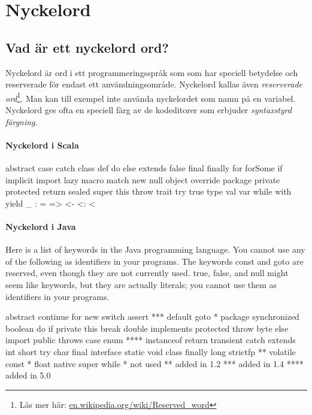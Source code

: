 
\chapter{Nyckelord}\label{appendix:keywords}

\section{Vad är ett nyckelord ord?}

Nyckelord är ord i ett programmeringsspråk som som har speciell betydelse och reserverade för endast ett användningsområde. Nyckelord kallas även \emph{reserverade ord}\footnote{Läs mer här: \href{https://en.wikipedia.org/wiki/Reserved\_word}{en.wikipedia.org/wiki/Reserved\_word}}. 
Man kan till exempel inte använda nyckelordet  som namn på en variabel. Nyckelord ges ofta en speciell färg av de kodeditorer som erbjuder \emph{syntaxstyrd färgning}. 

\subsubsection{Nyckelord i Scala} 

\begin{Code}
abstract    case        catch       class       def
do          else        extends     false       final
finally     for         forSome     if          implicit
import      lazy        macro       match       new
null        object      override    package     private
protected   return      sealed      super       this
throw       trait       try         true        type
val         var         while       with        yield
_    :    =    =>    <-    <:    <%
\end{Code}


\subsubsection{Nyckelord i Java}

Here is a list of keywords in the Java programming language. You cannot use any of the following as identifiers in your programs. The keywords const and goto are reserved, even though they are not currently used. true, false, and null might seem like keywords, but they are actually literals; you cannot use them as identifiers in your programs.

\begin{Code}[language=Java]
abstract 	continue 	for 	new 	switch
assert *** 	default 	goto * 	package 	synchronized
boolean 	do 	if 	private 	this
break 	double 	implements 	protected 	throw
byte 	else 	import 	public 	throws
case 	enum **** 	instanceof 	return 	transient
catch 	extends 	int 	short 	try
char 	final 	interface 	static 	void
class 	finally 	long 	strictfp ** 	volatile
const * 	float 	native 	super 	while
* 	  	not used
** 	  	added in 1.2
*** 	  	added in 1.4
**** 	  	added in 5.0
\end{Code}

